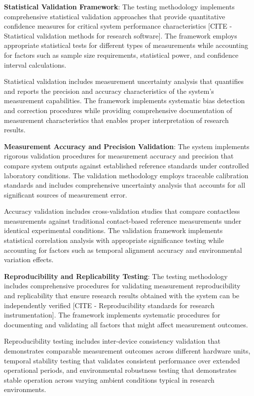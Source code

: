 \documentclass[12pt,a4paper]{article}
\begin{document}
\textbf{Statistical Validation Framework}: The testing methodology implements comprehensive statistical validation approaches
that provide quantitative confidence measures for critical system performance
characteristics [CITE - Statistical validation methods for research software]. The framework employs appropriate
statistical tests for different types of measurements while accounting for factors such as sample size requirements,
statistical power, and confidence interval calculations.

Statistical validation includes measurement uncertainty analysis that quantifies and reports the precision and accuracy
characteristics of the system's measurement capabilities. The framework implements systematic bias detection and
correction procedures while providing comprehensive documentation of measurement characteristics that enables proper
interpretation of research results.

\textbf{Measurement Accuracy and Precision Validation}: The system implements rigorous validation procedures for measurement
accuracy and precision that compare system outputs against established reference standards under controlled laboratory
conditions. The validation methodology employs traceable calibration standards and includes comprehensive uncertainty
analysis that accounts for all significant sources of measurement error.

Accuracy validation includes cross-validation studies that compare contactless measurements against traditional
contact-based reference measurements under identical experimental conditions. The validation framework implements
statistical correlation analysis with appropriate significance testing while accounting for factors such as temporal
alignment accuracy and environmental variation effects.

\textbf{Reproducibility and Replicability Testing}: The testing methodology includes comprehensive procedures for validating
measurement reproducibility and replicability that ensure research results obtained with the system can be independently
verified [CITE - Reproducibility standards for research instrumentation]. The framework implements systematic procedures
for documenting and validating all factors that might affect measurement outcomes.

Reproducibility testing includes inter-device consistency validation that demonstrates comparable measurement outcomes
across different hardware units, temporal stability testing that validates consistent performance over extended
operational periods, and environmental robustness testing that demonstrates stable operation across varying ambient
conditions typical in research environments.
\end{document}
